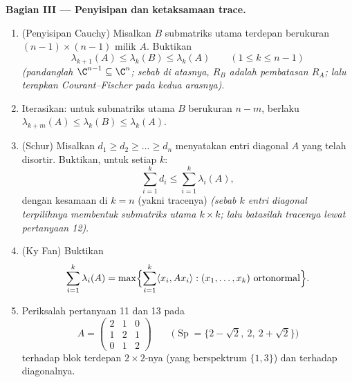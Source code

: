 \begin{problem}
\medskip
\noindent\textbf{Bagian III --- Penyisipan dan ketaksamaan
trace.}
\begin{enumerate}[resume]
  \item (Penyisipan Cauchy) Misalkan $B$ submatriks utama terdepan
        berukuran $(n-1)\times(n-1)$ milik $A$. Buktikan
        \[
        \lambda_{k+1}(A) \leq \lambda_k(B) \leq \lambda_k(A)
        \qquad (1 \leq k \leq n-1)
        \]
        \emph{(pandanglah $\C^{n-1} \subseteq \C^n$; sebab di atasnya, $R_B$
        adalah pembatasan $R_A$; lalu terapkan Courant--Fischer pada
        kedua arasnya)}.
  \item Iterasikan: untuk submatriks utama $B$ berukuran $n - m$,
        berlaku $\lambda_{k+m}(A) \leq \lambda_k(B) \leq
        \lambda_k(A)$.
  \item (Schur) Misalkan $d_1 \geq d_2 \geq \dots \geq d_n$ menyatakan
        entri diagonal $A$ yang telah disortir. Buktikan, untuk setiap $k$:
        \[
        \sum_{i=1}^{k} d_i \leq \sum_{i=1}^{k}\lambda_i(A),
        \]
        dengan kesamaan di $k = n$ (yakni tracenya)
        \emph{(sebab $k$ entri diagonal terpilihnya membentuk
        submatriks utama $k\times k$; lalu batasilah tracenya lewat
        pertanyaan 12)}.
  \item (Ky Fan) Buktikan
        \[
        \sum_{i=1}^{k}\lambda_i(A)
        = \max\Bigl\{\sum_{i=1}^{k}\langle x_i, Ax_i\rangle
        : (x_1, \dots, x_k) \text{ ortonormal}\Bigr\} .
        \]
  \item Periksalah pertanyaan 11 dan 13 pada
        \[
        A = \begin{pmatrix} 2 & 1 & 0\\ 1 & 2 & 1\\
        0 & 1 & 2\end{pmatrix}
        \qquad
        \bigl(\operatorname{Sp} = \{2 - \sqrt2,\ 2,\
        2+\sqrt2\}\bigr)
        \]
        terhadap blok terdepan $2\times2$-nya (yang berspektrum $\{1,
        3\}$) dan terhadap diagonalnya.
\end{enumerate}


\end{problem}
